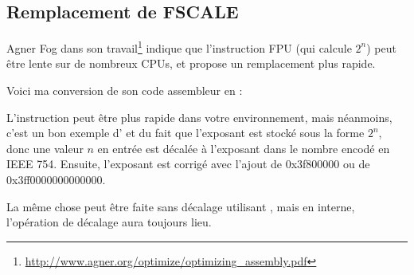 \subsection{Remplacement de FSCALE}

Agner Fog dans son travail\footnote{\url{http://www.agner.org/optimize/optimizing_assembly.pdf}}
indique que l'instruction \ac{FPU}  (qui calcule $2^n$) peut être lente
sur de nombreux CPUs, et propose un remplacement plus rapide.

Voici ma conversion de son code assembleur en \CCpp:



L'instruction  peut être plus rapide dans votre environnement, mais néanmoins,
c'est un bon exemple d' et du fait que l'exposant est stocké sous la forme
$2^n$, donc une valeur $n$ en entrée est décalée à l'exposant dans le nombre encodé
en IEEE 754.
Ensuite, l'exposant est corrigé avec l'ajout de 0x3f800000 ou de 0x3ff0000000000000.

La même chose peut être faite sans décalage utilisant , mais en interne,
l'opération de décalage aura toujours lieu.

